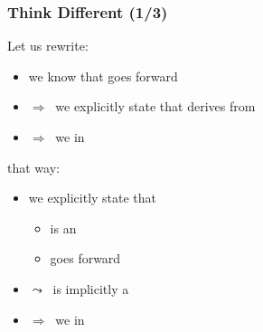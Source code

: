 \begin{frame}
  \frametitle{Think Different (1/3)}

Let us rewrite:
\medskip
%
\begin{itemize}
\scriptsize
\item we know that \bfarrayiteratorT goes forward
\item $\Rightarrow ~ $ we {\color{mediumgreen}explicitly} state that \bfarrayiteratorT derives from \bfForwardIterator
\item $\Rightarrow ~ $ we {\color{red}{define}} \bfnext in \bfarrayiteratorT
\end{itemize}

%
\bigskip
%

that way:
\medskip
%

\begin{itemize}
\scriptsize
\item we {\color{mediumgreen}explicitly} state that \bfarrayiteratorT
  \begin{itemize} \scriptsize
  \item is an \bfIterator
  \item goes forward
  \end{itemize}
\item $\leadsto ~ $ \bfarrayiteratorT is {\color{mediumgreen}implicitly} a \bfForwardIterator
\item $\Rightarrow ~ $ we {\color{red}{define}} \bfnext in \bfarrayiteratorT
\end{itemize}

\end{frame}




